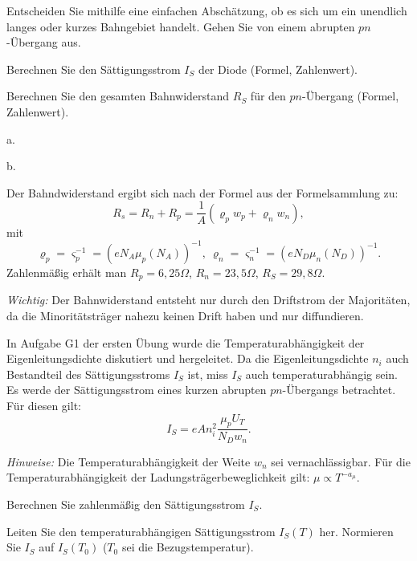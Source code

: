 \documentclass{article}
\begin{document}
\begin{exercise}
\begin{tasks}
        \item Entscheiden Sie mithilfe eine einfachen Abschätzung, ob es sich um ein unendlich langes oder kurzes Bahngebiet handelt. Gehen Sie von einem abrupten $pn$-Übergang aus.
        \item Berechnen Sie den Sättigungsstrom $I_S$ der Diode (Formel, Zahlenwert).
        \item Berechnen Sie den gesamten Bahnwiderstand $R_S$ für den $pn$-Übergang (Formel, Zahlenwert).
\end{tasks}
\end{exercise}

\begin{solution}
    \begin{tasks}
            \item a.
            \item b.
        \item Der Bahndwiderstand ergibt sich nach der Formel aus der Formelsammlung zu:
$$
R_s=R_n+R_p=\frac{1}{A}(\varrho_p w_p +\varrho_n w_n),
$$
mit
$$
\varrho_p=\varsigma_p^{-1}={(e N_A\mu_p(N_A))}^{-1},\ \varrho_n=\varsigma_n^{-1}={(e N_D\mu_n(N_D))}^{-1}.
$$
Zahlenmäßig erhält man $R_p=6,25\Omega$, $R_n=23,5\Omega$, $R_S=29,8\Omega$.

\emph{Wichtig:} Der Bahnwiderstand entsteht nur durch den Driftstrom der Majoritäten, da die Minoritätsträger nahezu keinen Drift haben und nur diffundieren.

\end{tasks}
\end{solution}

\begin{exercise}
In Aufgabe G1 der ersten Übung wurde die Temperaturabhängigkeit der Eigenleitungsdichte diskutiert und hergeleitet.
Da die Eigenleitungsdichte $n_i$ auch Bestandteil des Sättigungsstroms $I_S$ ist, miss $I_S$ auch temperaturabhängig sein. Es werde der Sättigungsstrom eines kurzen abrupten $pn$-Übergangs betrachtet. Für diesen gilt:
$$
I_S = eAn_i^2\frac{\mu_p U_T}{N_D w_n}.
$$

\emph{Hinweise:} Die Temperaturabhängigkeit der Weite $w_n$ sei vernachlässigbar.
Für die Temperaturabhängigkeit der Ladungsträgerbeweglichkeit gilt: $\mu \propto T^{-a_\mu}$.

\begin{tasks}
        \item Berechnen Sie zahlenmäßig den Sättigungsstrom $I_S$.
        \item Leiten Sie den temperaturabhängigen Sättigungsstrom $I_S(T)$ her. Normieren Sie $I_S$ auf $I_S(T_0)$ ($T_0$ sei die Bezugstemperatur).
\end{tasks}
\end{exercise}
\end{document}
